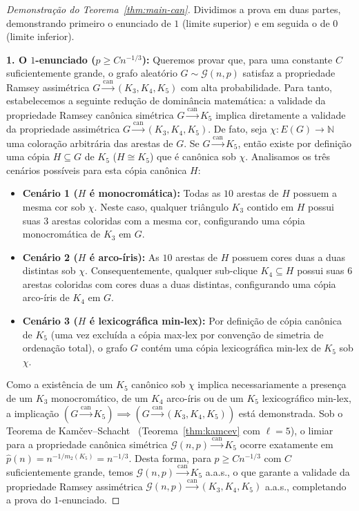 \documentclass[reqno, 12pt]{amsart}
\numberwithin{equation}{section}
\theoremstyle{plain}
\theoremstyle{definition}
\newcommand{\Gnp}{\mathcal{G}(n,p)}
\newcommand{\mdens}{m_2}
\newcommand{\whp}{a.a.s.}
\begin{document}
\begin{proof}[Demonstração do Teorema~\ref{thm:main-can}]
    Dividimos a prova em duas partes, demonstrando primeiro o enunciado de $1$ (limite superior) e em seguida o de $0$ (limite inferior).

    \medskip
    \noindent\textbf{1. O $1$-enunciado ($p \ge C n^{-1/3}$):}
    Queremos provar que, para uma constante $C$ suficientemente grande, o grafo aleatório $G \sim \Gnp$ satisfaz a propriedade Ramsey assimétrica $G \xrightarrow{\mathrm{can}} (K_3, K_4, K_5)$ com alta probabilidade.
    Para tanto, estabelecemos a seguinte redução de dominância matemática: a validade da propriedade Ramsey canônica simétrica $G \xrightarrow{\mathrm{can}} K_5$ implica diretamente a validade da propriedade assimétrica $G \xrightarrow{\mathrm{can}} (K_3, K_4, K_5)$.
    De fato, seja $\chi: E(G) \to \mathbb{N}$ uma coloração arbitrária das arestas de $G$. Se $G \xrightarrow{\mathrm{can}} K_5$, então existe por definição uma cópia $H \subseteq G$ de $K_5$ ($H \cong K_5$) que é canônica sob $\chi$. Analisamos os três cenários possíveis para esta cópia canônica $H$:
    \begin{itemize}
        \item \textbf{Cenário 1 ($H$ é monocromática):} Todas as $10$ arestas de $H$ possuem a mesma cor sob $\chi$. Neste caso, qualquer triângulo $K_3$ contido em $H$ possui suas $3$ arestas coloridas com a mesma cor, configurando uma cópia monocromática de $K_3$ em $G$.
        \item \textbf{Cenário 2 ($H$ é arco-íris):} As $10$ arestas de $H$ possuem cores duas a duas distintas sob $\chi$. Consequentemente, qualquer sub-clique $K_4 \subseteq H$ possui suas $6$ arestas coloridas com cores duas a duas distintas, configurando uma cópia arco-íris de $K_4$ em $G$.
        \item \textbf{Cenário 3 ($H$ é lexicográfica min-lex):} Por definição de cópia canônica de $K_5$ (uma vez excluída a cópia max-lex por convenção de simetria de ordenação total), o grafo $G$ contém uma cópia lexicográfica min-lex de $K_5$ sob $\chi$.
    \end{itemize}
    Como a existência de um $K_5$ canônico sob $\chi$ implica necessariamente a presença de um $K_3$ monocromático, de um $K_4$ arco-íris ou de um $K_5$ lexicográfico min-lex, a implicação $(G \xrightarrow{\mathrm{can}} K_5) \implies (G \xrightarrow{\mathrm{can}} (K_3, K_4, K_5))$ está demonstrada.
    Sob o Teorema de Kamčev--Schacht~\cite{kamcev2023canonical} (Teorema~\ref{thm:kamcev} com $\ell = 5$), o limiar para a propriedade canônica simétrica $\Gnp \xrightarrow{\mathrm{can}} K_5$ ocorre exatamente em $\hat{p}(n) = n^{-1/\mdens(K_5)} = n^{-1/3}$.
    Desta forma, para $p \ge C n^{-1/3}$ com $C$ suficientemente grande, temos $\Gnp \xrightarrow{\mathrm{can}} K_5$ \whp, o que garante a validade da propriedade Ramsey assimétrica $\Gnp \xrightarrow{\mathrm{can}} (K_3, K_4, K_5)$ \whp, completando a prova do $1$-enunciado.


\end{proof}
\end{document}

